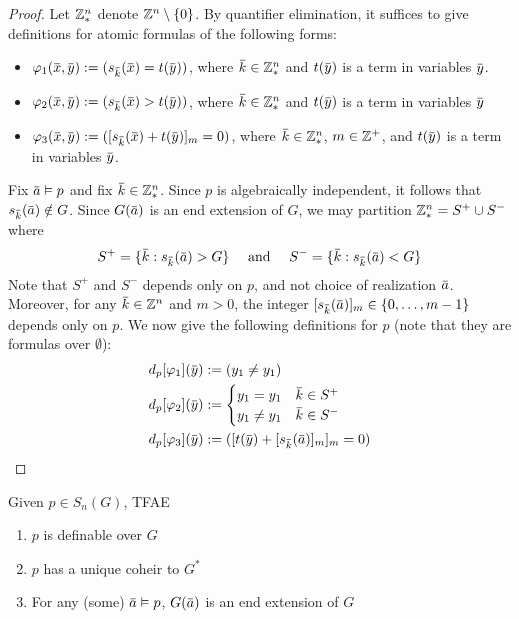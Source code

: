 \documentclass[11pt]{article}
\begin{document}
\begin{proof}
Let \(\mathbb{Z}^n_*\) denote \(\mathbb{Z}^n\setminus\{0\}\). By quantifier elimination, it suffices to give definitions  for
atomic formulas of the following forms:
\begin{itemize}
\item \(\varphi_1(\barx,\bary):=(s_{\bark}(\barx)=t(\bary))\), where \(\bark\in\Z^n_*\) and \(t(\bary)\) is a
term in variables \(\bary\).
\item \(\varphi_2(\barx,\bary):=(s_{\bark}(\barx)>t(\bary))\), where \(\bark\in\Z^n_*\) and \(t(\bary)\) is a
term in variables \(\bary\)
\item \(\varphi_3(\barx,\bary):=([s_{\bark}(\barx)+t(\bary)]_m=0)\), where \(\bark\in\Z^n_*\), \(m\in\mathbb{Z}^+\),
and \(t(\bary)\) is a term in variables \(\bary\).
\end{itemize}

Fix \(\bara\vDash p\) and fix \(\bark\in\Z_*^n\). Since \(p\) is algebraically independent, it follows
that \(s_{\bark}(\bara)\notin G\). Since \(G(\bara)\) is an end extension of \(G\), we may
partition \(\mathbb{Z}^n_*=S^+\cup S^-\) where
\begin{equation*}
S^+=\{\bark:s_{\bark}(\bara)>G\} \quad\text{ and }\quad S^-=\{\bark:s_{\bark}(\bara)<G\}
\end{equation*}
Note that \(S^+\) and \(S^-\) depends only on \(p\), and not choice of realization \(\bara\).
Moreover, for any \(\bark\in\Z^n\) and \(m>0\), the integer \([s_{\bark}(\bara)]_m\in\{0,\dots,m-1\}\)
depends only on \(p\). We now give the following definitions for \(p\) (note that they are
formulas over \(\emptyset\)):
\begin{align*}
&d_p[\varphi_1](\bary):=(y_1\neq y_1)\\
&d_p[\varphi_2](\bary):=
\begin{cases}
y_1=y_1&\bark\in S^+\\
y_1\neq y_1&\bark\in S^-
\end{cases}\\
&d_p[\varphi_3](\bary):=([t(\bary)+[s_{\bark}(\bara)]_m]_m=0)
\end{align*}
\end{proof}

\begin{theorem}[]
\label{0.7}
Given \(p\in S_n(G)\), TFAE
\begin{enumerate}
\item \(p\) is definable over \(G\)
\item \(p\) has a unique coheir to \(G^*\)
\item For any (some) \(\bara\vDash p\), \(G(\bara)\) is an end extension of \(G\)
\end{enumerate}
\end{theorem}
\end{document}
